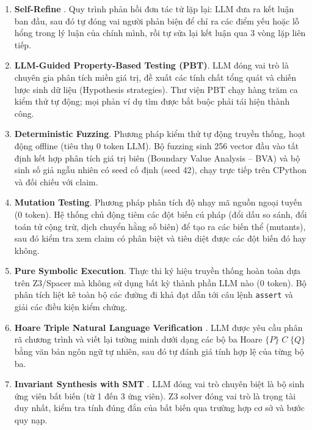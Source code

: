 \begin{enumerate}
    \item[\textbf{Baseline H:}] \textbf{Self-Refine} \cite{madaan2024self}. Quy trình phản hồi đơn tác tử lặp lại: LLM đưa ra kết luận ban đầu, sau đó tự đóng vai người phản biện để chỉ ra các điểm yếu hoặc lỗ hổng trong lý luận của chính mình, rồi tự sửa lại kết luận qua 3 vòng lặp liên tiếp.
    \item[\textbf{Baseline I:}] \textbf{LLM-Guided Property-Based Testing (PBT)}. LLM đóng vai trò là chuyên gia phân tích miền giá trị, đề xuất các tính chất tổng quát và chiến lược sinh dữ liệu (Hypothesis strategies). Thư viện PBT chạy hàng trăm ca kiểm thử tự động; mọi phản ví dụ tìm được bắt buộc phải tái hiện thành công.
    \item[\textbf{Baseline J:}] \textbf{Deterministic Fuzzing}. Phương pháp kiểm thử tự động truyền thống, hoạt động offline (tiêu thụ 0 token LLM). Bộ fuzzing sinh 256 vector đầu vào tất định kết hợp phân tích giá trị biên (Boundary Value Analysis -- BVA) và bộ sinh số giả ngẫu nhiên có seed cố định (seed 42), chạy trực tiếp trên CPython và đối chiếu với claim.
    \item[\textbf{Baseline K:}] \textbf{Mutation Testing}. Phương pháp phân tích độ nhạy mã nguồn ngoại tuyến (0 token). Hệ thống chủ động tiêm các đột biến cú pháp (đổi dấu so sánh, đổi toán tử cộng trừ, dịch chuyển hằng số biên) để tạo ra các biến thể (mutants), sau đó kiểm tra xem claim có phân biệt và tiêu diệt được các đột biến đó hay không.
    \item[\textbf{Baseline L:}] \textbf{Pure Symbolic Execution}. Thực thi ký hiệu truyền thống hoàn toàn dựa trên Z3/Spacer mà không sử dụng bất kỳ thành phần LLM nào (0 token). Bộ phân tích liệt kê toàn bộ các đường đi khả đạt dẫn tới câu lệnh \texttt{assert} và giải các điều kiện kiểm chứng.
    \item[\textbf{Baseline M:}] \textbf{Hoare Triple Natural Language Verification} \cite{bouras2026hoareprompt}. LLM được yêu cầu phân rã chương trình và viết lại tường minh dưới dạng các bộ ba Hoare $\{P\} \; C \; \{Q\}$ bằng văn bản ngôn ngữ tự nhiên, sau đó tự đánh giá tính hợp lệ của từng bộ ba.
    \item[\textbf{Baseline N:}] \textbf{Invariant Synthesis with SMT} \cite{si2020code2inv,wang2026bali}. LLM đóng vai trò chuyên biệt là bộ sinh ứng viên bất biến (từ 1 đến 3 ứng viên). Z3 solver đóng vai trò là trọng tài duy nhất, kiểm tra tính đúng đắn của bất biến qua trường hợp cơ sở và bước quy nạp.
\end{enumerate}

